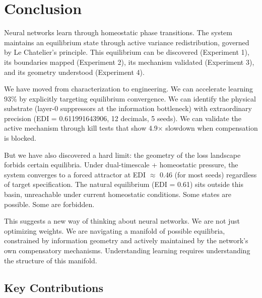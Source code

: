 \section{Conclusion}\label{sec:conclusion}

Neural networks learn through homeostatic phase transitions. The system maintains an equilibrium state through active variance redistribution, governed by Le Chatelier's principle. This equilibrium can be discovered (Experiment 1), its boundaries mapped (Experiment 2), its mechanism validated (Experiment 3), and its geometry understood (Experiment 4).

We have moved from characterization to engineering. We can accelerate learning 93\% by explicitly targeting equilibrium convergence. We can identify the physical substrate (layer-0 suppressors at the information bottleneck) with extraordinary precision (EDI = 0.611991643906, 12 decimals, 5 seeds). We can validate the active mechanism through kill tests that show 4.9× slowdown when compensation is blocked.

But we have also discovered a hard limit: the geometry of the loss landscape forbids certain equilibria. Under dual-timescale + homeostatic pressure, the system converges to a forced attractor at EDI $\approx$ 0.46 (for most seeds) regardless of target specification. The natural equilibrium (EDI = 0.61) sits outside this basin, unreachable under current homeostatic conditions. Some states are possible. Some are forbidden.

This suggests a new way of thinking about neural networks. We are not just optimizing weights. We are navigating a manifold of possible equilibria, constrained by information geometry and actively maintained by the network's own compensatory mechanisms. Understanding learning requires understanding the structure of this manifold.

\subsection{Key Contributions}

